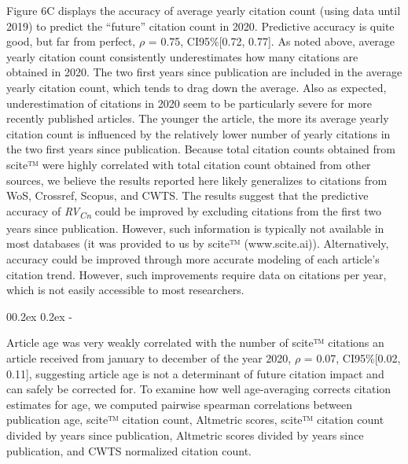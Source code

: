 \documentclass[
  man,floatsintext]{apa6}
\makeatletter
\let\oldsubparagraph\subparagraph
\renewcommand{\subparagraph}[1]{\oldsubparagraph{#1}\mbox{}}
\renewcommand{\subparagraph}[1]{\@startsection{subparagraph}{5}{1em}%
  {0\baselineskip \@plus 0.2ex \@minus 0.2ex}%
  {-\z@\relax}%
  {\normalfont\normalsize\itshape\hspace{\parindent}{#1}\textit{\addperi}}{\relax}}
\makeatother
\begin{document}
Figure 6C displays the accuracy of average yearly citation count (using data until 2019) to predict the ``future'' citation count in 2020. Predictive accuracy is quite good, but far from perfect, \(\rho\) = 0.75, CI95\%{[}0.72, 0.77{]}. As noted above, average yearly citation count consistently underestimates how many citations are obtained in 2020. The two first years since publication are included in the average yearly citation count, which tends to drag down the average. Also as expected, underestimation of citations in 2020 seem to be particularly severe for more recently published articles. The younger the article, the more its average yearly citation count is influenced by the relatively lower number of yearly citations in the two first years since publication. Because total citation counts obtained from scite™ were highly correlated with total citation count obtained from other sources, we believe the results reported here likely generalizes to citations from WoS, Crossref, Scopus, and CWTS. The results suggest that the predictive accuracy of \emph{RV\textsubscript{Cn}} could be improved by excluding citations from the first two years since publication. However, such information is typically not available in most databases (it was provided to us by scite™ (www.scite.ai)). Alternatively, accuracy could be improved through more accurate modeling of each article's citation trend. However, such improvements require data on citations per year, which is not easily accessible to most researchers.

\hypertarget{predictive-unbiasedness}{%
\subparagraph{Predictive unbiasedness}\label{predictive-unbiasedness}}

Article age was very weakly correlated with the number of scite™ citations an article received from january to december of the year 2020, \(\rho\) = 0.07, CI95\%{[}0.02, 0.11{]}, suggesting article age is not a determinant of future citation impact and can safely be corrected for. To examine how well age-averaging corrects citation estimates for age, we computed pairwise spearman correlations between publication age, scite™ citation count, Altmetric scores, scite™ citation count divided by years since publication, Altmetric scores divided by years since publication, and CWTS normalized citation count.
\end{document}
